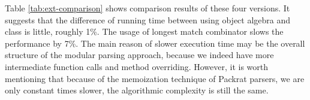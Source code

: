 Table \ref{tab:ext-comparison} shows comparison results of these four versions. It suggests that the difference of running time between
using object algebra and class is little, roughly 1\%.
The usage of longest match combinator slows the performance by 7\%. The main reason of slower
execution time may be the overall structure of the modular parsing approach, because we indeed have
more intermediate function calls and method overriding. However, it is worth mentioning that
because of the memoization technique of Packrat parsers, we are only constant times
slower, the algorithmic complexity is still the same.

